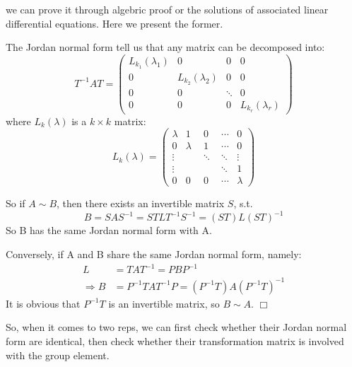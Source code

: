 \documentclass[]{ctexart}
\begin{document}
    we can prove it through  algebric proof or the solutions of associated linear differential equations. Here we present the former.
    
    The Jordan normal form tell us that any matrix can be decomposed into:
    \begin{equation*}
    	T^{-1}AT=
    	\begin{pmatrix}
    	L_{k_1}(\lambda_1)&0&0&0\\
    	0&L_{k_2}(\lambda_2)&0&0\\
    	0&0&\ddots          &0\\
    	0&0&0&L_{k_r}(\lambda_r) 
    	\end{pmatrix}
    \end{equation*}
    where $L_k(\lambda)$ is a $k\times k$ matrix: 
    \begin{equation*}
    	L_k(\lambda)=
    	\begin{pmatrix}
    	\lambda&1&0&\cdots&0\\
    	0&\lambda&1&\cdots&0\\
    	\vdots&\quad&\ddots&\ddots&\vdots\\
    	\vdots&\quad&\quad&\ddots&1\\
    	0&0&0&\cdots&\lambda
    	\end{pmatrix}
    \end{equation*}
    
    So if $A\sim B$, then there exists an invertible matrix $S$, s.t.
    \begin{equation*}
      B=SAS^{-1}=STLT^{-1}S^{-1}=(ST)L(ST)^{-1}
    \end{equation*}
    So B has the same Jordan normal form with A. 
    
    Conversely, if A and B share the same Jordan normal form, namely:
    \begin{equation*}
    \begin{aligned}
     L&=TAT^{-1}=PBP^{-1}\\
     \Rightarrow B&=P^{-1}TAT^{-1}P=(P^{-1}T)A(P^{-1}T)^{-1}
    \end{aligned}
    \end{equation*}
    It is obvious that $P^{-1}T$ is an invertible matrix, so $B\sim A$. \qquad $\Box$
    
    So, when it comes to two reps, we can first check whether their Jordan normal form are identical, then check whether their transformation matrix is involved with the group element. 
    
\end{document}
